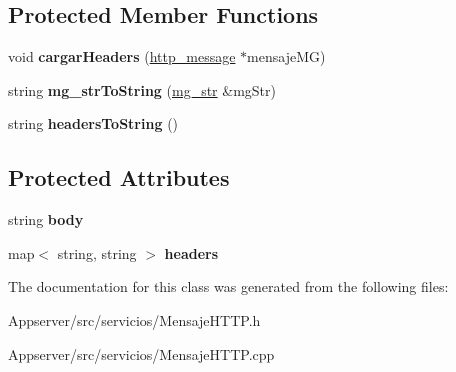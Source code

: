 \subsection*{Protected Member Functions}
\begin{DoxyCompactItemize}
\item 
void {\bfseries cargar\+Headers} (\hyperlink{structhttp__message}{http\+\_\+message} $\ast$mensaje\+MG)\hypertarget{classMensajeHTTP_a8f1cf1e316cf0e690c4997262301c8b0}{}\label{classMensajeHTTP_a8f1cf1e316cf0e690c4997262301c8b0}

\item 
string {\bfseries mg\+\_\+str\+To\+String} (\hyperlink{structmg__str}{mg\+\_\+str} \&mg\+Str)\hypertarget{classMensajeHTTP_a5b13801cd2ea67aec646315661c9c7d5}{}\label{classMensajeHTTP_a5b13801cd2ea67aec646315661c9c7d5}

\item 
string {\bfseries headers\+To\+String} ()\hypertarget{classMensajeHTTP_acac8b954266349e08823a5b036b7b28d}{}\label{classMensajeHTTP_acac8b954266349e08823a5b036b7b28d}

\end{DoxyCompactItemize}
\subsection*{Protected Attributes}
\begin{DoxyCompactItemize}
\item 
string {\bfseries body}\hypertarget{classMensajeHTTP_a4dfdf400c066b6f55d29986feff110c9}{}\label{classMensajeHTTP_a4dfdf400c066b6f55d29986feff110c9}

\item 
map$<$ string, string $>$ {\bfseries headers}\hypertarget{classMensajeHTTP_a3f3375d37fcec2dec4562119408ca4a5}{}\label{classMensajeHTTP_a3f3375d37fcec2dec4562119408ca4a5}

\end{DoxyCompactItemize}


The documentation for this class was generated from the following files\+:\begin{DoxyCompactItemize}
\item 
Appserver/src/servicios/Mensaje\+H\+T\+T\+P.\+h\item 
Appserver/src/servicios/Mensaje\+H\+T\+T\+P.\+cpp\end{DoxyCompactItemize}
